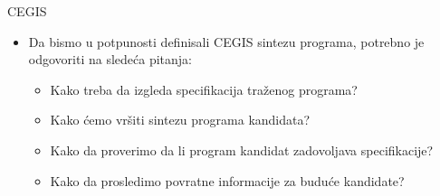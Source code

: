 \begin{frame}{CEGIS}
    \begin{itemize}
        \item Da bismo u potpunosti definisali CEGIS sintezu programa, potrebno je odgovoriti na sledeća pitanja:
        \begin{itemize}
            \item Kako treba da izgleda specifikacija traženog programa?
            \item Kako ćemo vršiti sintezu programa kandidata?
            \item Kako da proverimo da li program kandidat zadovoljava specifikacije?
            \item Kako da prosledimo povratne informacije za buduće kandidate?
        \end{itemize}
    \end{itemize}
\end{frame}
